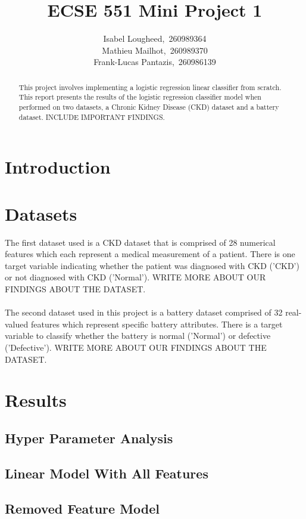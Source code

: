 \documentclass{article}
\title{ECSE 551 Mini Project 1}
\author{
  Isabel Lougheed,~260989364 \\
  \And
  Mathieu Mailhot,~260989370 \\
  \And
  Frank-Lucas Pantazis,~260986139 \\
}
\begin{document}
\maketitle

\begin{abstract}
  This project involves implementing a logistic regression linear classifier from scratch.  This report presents the results of the logistic regression classifier model when performed on two datasets, a Chronic Kidney Disease (CKD) dataset and a battery dataset.  INCLUDE IMPORTANT FINDINGS.
\end{abstract}

\section{Introduction}

\section{Datasets}


The first dataset used is a CKD dataset that is comprised of 28 numerical features which each represent a medical measurement of a patient.  There is one target variable indicating whether the patient was diagnosed with CKD ('CKD') or not diagnosed with CKD ('Normal').  WRITE MORE ABOUT OUR FINDINGS ABOUT THE DATASET.
\\
\\
The second dataset used in this project is a battery dataset comprised of 32 real-valued features which represent specific battery attributes.  There is a target variable to classify whether the battery is normal ('Normal') or defective ('Defective').  WRITE MORE ABOUT OUR FINDINGS ABOUT THE DATASET.


\section{Results}
\subsection{Hyper Parameter Analysis}

\subsection{Linear Model With All Features}

\subsection{Removed Feature Model}
\end{document}
